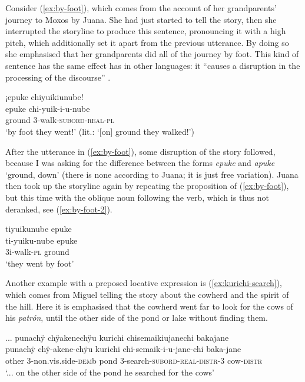 Consider (\ref{ex:by-foot}), which comes from the account of her grandparents’ journey to Moxos by Juana. She had just started to tell the story, then she interrupted the storyline to produce this sentence, pronouncing it with a high pitch, which additionally set it apart from the previous utterance. By doing so she emphasised that her grandparents did all of the journey by foot. This kind of sentence has the same effect  has in other languages: it “causes a disruption in the processing of the discourse” \citep[39]{Westbury2016}.

\ea\label{ex:by-foot}
\begingl
\glpreamble ¡epuke chiyuikiunube!\\
\gla epuke chi-yuik-i-u-nube\\
\glb ground 3-walk-\textsc{subord}-\textsc{real}-\textsc{pl}\\
\glft ‘by foot they went!’ (lit.: ‘[on] ground they walked!’)
\endgl
\trailingcitation{[jxx-p151016l-2.022]}
\xe

After the utterance in (\ref{ex:by-foot}), some disruption of the story followed, because I was asking for the difference between the forms \textit{epuke} and \textit{apuke} ‘ground, down’ (there is none according to Juana; it is just free variation). Juana then took up the storyline again by repeating the proposition of (\ref{ex:by-foot}), but this time with the oblique noun following the verb, which is thus not deranked, see (\ref{ex:by-foot-2}).

\newpage
\ea\label{ex:by-foot-2}
\begingl
\glpreamble tiyuikunube epuke\\
\gla ti-yuiku-nube epuke\\
\glb 3i-walk-\textsc{pl} ground\\
\glft ‘they went by foot’
\endgl
\trailingcitation{[jxx-p151016l-2.028]}
\xe

Another example with a preposed locative expression is (\ref{ex:kurichi-search}), which comes from Miguel telling the story about the cowherd and the spirit of the hill. Here it is emphasised that the cowherd went far to look for the cows of his \textit{patrón}, until the other side of the pond or lake without finding them.

\ea\label{ex:kurichi-search}
\begingl 
\glpreamble ... punachÿ chÿakenechÿu kurichi chisemaikiujanechi bakajane\\
\gla punachÿ chÿ-akene-chÿu kurichi chi-semaik-i-u-jane-chi baka-jane\\ 
\glb  other 3-non.vis.side-\textsc{dem}b pond 3-search-\textsc{subord}-\textsc{real}-\textsc{distr}-3 cow-\textsc{distr}\\ 
\glft ‘... on the other side of the pond he searched for the cows’
\trailingcitation{[mxx-n151017l-1.15]}
\xe


